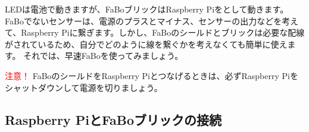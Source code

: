 LEDは電池で動きますが、FaBoブリックはRaspberry Piをとして動きます。FaBoでないセンサーは、電源のプラスとマイナス、センサーの出力などを考えて、Raspberry Piに繋ぎます。しかし、FaBoのシールドとブリックは必要な配線がされているため、自分でどのように線を繋ぐかを考えなくても簡単に使えます。
それでは、早速FaBoを使ってみましょう。

\begin{itembox}[c]{\Large\textcolor{red}{注意！}}
  FaBoのシールドをRaspberry Piとつなげるときは、必ずRaspberry Piをシャットダウンして電源を切りましょう。
\end{itembox}

\subsection{Raspberry PiとFaBoブリックの接続}
